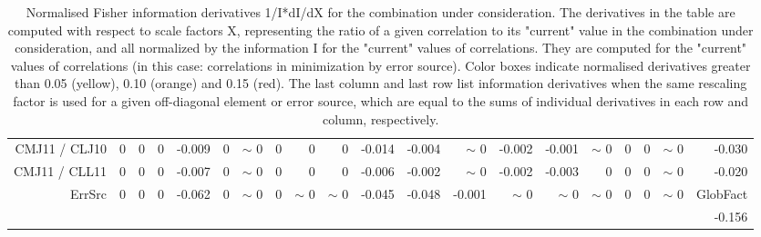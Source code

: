 \begin{table}[H]
\begin{center}
\begin{tabular}{|r|rrrrrrrrrrrrrrrrrr|r|}
CMJ11 / CLJ10 &  0 &  0 &  0 &     -0.009 &  0 &  {\tiny $\sim$ }0 &  0 &  0 &  0 &     -0.014 &     -0.004 &  {\tiny $\sim$ }0 &     -0.002 &     -0.001 &  {\tiny $\sim$ }0 &  0 &  0 &  {\tiny $\sim$ }0 &     -0.030 \\
CMJ11 / CLL11 &  0 &  0 &  0 &     -0.007 &  0 &  {\tiny $\sim$ }0 &  0 &  0 &  0 &     -0.006 &     -0.002 &  {\tiny $\sim$ }0 &     -0.002 &     -0.003 &  0 &  0 &  0 &  {\tiny $\sim$ }0 &     -0.020 \\
\hline
\multirow{2}{*}{ErrSrc} & \multirow{2}{*}{ 0} & \multirow{2}{*}{ 0} & \multirow{2}{*}{ 0} & \multirow{2}{*}{    -0.062} & \multirow{2}{*}{ 0} & \multirow{2}{*}{ {\tiny $\sim$ }0} & \multirow{2}{*}{ 0} & \multirow{2}{*}{ {\tiny $\sim$ }0} & \multirow{2}{*}{ {\tiny $\sim$ }0} & \multirow{2}{*}{    -0.045} & \multirow{2}{*}{    -0.048} & \multirow{2}{*}{    -0.001} & \multirow{2}{*}{ {\tiny $\sim$ }0} & \multirow{2}{*}{ {\tiny $\sim$ }0} & \multirow{2}{*}{ {\tiny $\sim$ }0} & \multirow{2}{*}{ 0} & \multirow{2}{*}{ 0} & \multirow{2}{*}{ {\tiny $\sim$ }0} & GlobFact\\
 & & & & & & & & & & & & & & & & & & &     -0.156 \\
\hline
\end{tabular}
\renewcommand{\arraystretch}{1}
\caption{Normalised Fisher information derivatives 1/I*dI/dX for the combination under consideration. The derivatives in the table are computed with respect to scale factors X, representing the ratio of a given correlation to its "current" value in the combination under consideration, and all normalized by the information I for the "current" values of correlations. They are computed for the "current" values of correlations (in this case: correlations in minimization by error source). Color boxes indicate normalised derivatives greater than 0.05 (yellow), 0.10 (orange) and 0.15 (red). The last column and last row list information derivatives when the same rescaling factor is used for a given off-diagonal element or error source, which are equal to the sums of individual derivatives in each row and column, respectively.}
\end{center}
\end{table}
